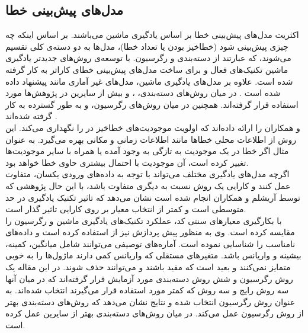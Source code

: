 \subsection{مدل‌های پیش‌بینی خطا}
\label{subsec:models}
اکثریت مدل‌های پیش‌بینی خطا بر اساس یادگیری ماشین می‌باشند. بر اساس اینکه چه چیزی پیش‌بینی شود (خطاخیز بودن یا تعداد خطا)، مدل‌ها به دو دسته‌ی کلی تقسیم می‌شوند، که عبارتند از دسته‌بندی و رگرسیون. با توسعه‌ی روش‌های جدیدتر یادگیری ماشین تکنیک‌های فعال و  برای ساخت مدل‌های پیش‌بینی خطای کاراتر به کار گرفته شده است\cite{li2012sample}. علاوه بر مدل‌های یادگیری ماشین، مدل‌های غیر آماری مانند   پیشنهاد داده شده است \cite{kim2007predicting}. در میان روش‌های دسته‌بندی، 
 ،
 و
بیش از سایرین در پژوهش‌ها مورد استفاده قرار گرفته‌اند. همچنین در میان روش‌های رگرسیون،
 و 
به طور گسترده به کار گرفته شده‌اند \cite{nam2014survey}. \\
 و همکاران   را ارائه داده‌اند که  اولویت موجودیت‌های خطاخیز در   را نگهداری  می‌کند. این روش از اطلاعات محلی خطاها مانند اطلاعات زمانی و مکانی بهره می‌گیرد. به عنوان مثال اگر خطا در یک موجودیت به تازگی به وجود آمده یا همراه با سایر موجودیت‌ها تغییر کرده است، آن موجودیت با احتمال بیشتری حاوی خطا خواهد بود.\\
اگرچه مدل‌های یادگیری مختلف می‌تواند  با توجه به داده‌های ورودی یکسان، متفاوت عمل کنند و کارایی یک روش نسبت به دیگری متفاوت باشد، با این حال پژوهشی که توسط آریشلم  و همکاران  \cite{arisholm2010systematic} انجام شده است نشان می‌دهد که تاثیر  تکنیک یادگیری در حد متوسطی است و کمتر از انتخاب معیار بر روی کارایی تاثیر گذار است.  \\

 با بکارگیری معیارهای سنتی کد، عملکرد تکنیک‌های یادگیری ماشین و رگرسیون را مقایسه کرده است\cite{malhotra2014comparative}. وی به منظور پیش پردازش نیز از   استفاده کرده است و داده‌های نامناسب را شناسایی نموده است. آماره‌های توصیفی می‌توانند شامل میانگین، کمینه، بیشینه و واریانس باشد. متغیرهای مستقلی که  واریانس کمی دارند ماژول‌ها را به خوبی متمایز نمی‌کنند و بعید است که مفید باشند و می‌توانند حذف شوند. در این مقاله یک روش رگرسیون و شش روش دسته‌بندی مورد آزمایش قرار گرفته‌اند که در میان آنها سه روش رایج و سه روش که کمتر مورد استفاده قرار می‌گیرند انتخاب شده‌اند.  به عنوان روش رگرسیون انتخاب شده و نتایج نشان می‌دهد که روش‌های دسته‌بندی بهتر از روش رگرسیون عمل می‌کند. در میان روش‌های دسته‌بندی  بهتر از سایرین عمل کرده است. 


